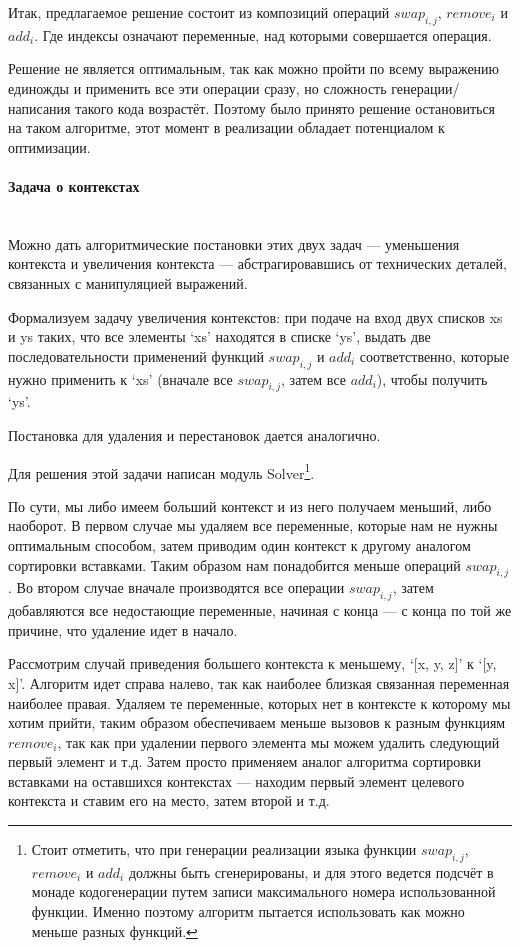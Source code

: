 \hfill

Итак, предлагаемое решение состоит из композиций операций $swap_{i,j}$, $remove_i$ и $add_i$. Где индексы означают переменные, над которыми совершается операция.

Решение не является оптимальным, так как можно пройти по всему выражению единожды и применить все эти операции сразу, но сложность генерации/написания такого кода возрастёт. Поэтому было принято решение остановиться на таком алгоритме, этот момент в реализации обладает потенциалом к оптимизации.

\paragraph{Задача о контекстах} \hspace{0pt} \\

Можно дать алгоритмические постановки этих двух задач --- уменьшения контекста и увеличения контекста --- абстрагировавшись от технических деталей, связанных с манипуляцией выражений.

Формализуем задачу увеличения контекстов: при подаче на вход двух списков xs и ys таких, что все элементы `xs' находятся в списке `ys', выдать две последовательности применений функций $swap_{i,j}$ и $add_i$ соответственно, которые нужно применить к `xs' (вначале все $swap_{i,j}$, затем все $add_i$), чтобы получить `ys'.

Постановка для удаления и перестановок дается аналогично.

Для решения этой задачи написан модуль Solver\footnote{Стоит отметить, что при генерации реализации языка функции $swap_{i,j}$, $remove_i$ и $add_i$ должны быть сгенерированы, и для этого ведется подсчёт в монаде кодогенерации путем записи максимального номера использованной функции. Именно поэтому алгоритм пытается использовать как можно меньше разных функций.}.

По сути, мы либо имеем больший контекст и из него получаем меньший, либо наоборот. В первом случае мы удаляем все переменные, которые нам не нужны оптимальным способом, затем приводим один контекст к другому аналогом сортировки вставками. Таким образом нам понадобится меньше операций $swap_{i,j}$. Во втором случае вначале производятся все операции $swap_{i,j}$, затем добавляются все недостающие переменные, начиная с конца --- с конца по той же причине, что удаление идет в начало.

Рассмотрим случай приведения большего контекста к меньшему, `[x, y, z]' к `[y, x]'. Алгоритм идет справа налево, так как наиболее близкая связанная переменная наиболее правая. Удаляем те переменные, которых нет в контексте к которому мы хотим прийти, таким образом обеспечиваем меньше вызовов к разным функциям $remove_i$, так как при удалении первого элемента мы можем удалить следующий первый элемент и т.д. Затем просто применяем аналог алгоритма сортировки вставками на оставшихся контекстах --- находим первый элемент целевого контекста и ставим его на место, затем второй и т.д.

